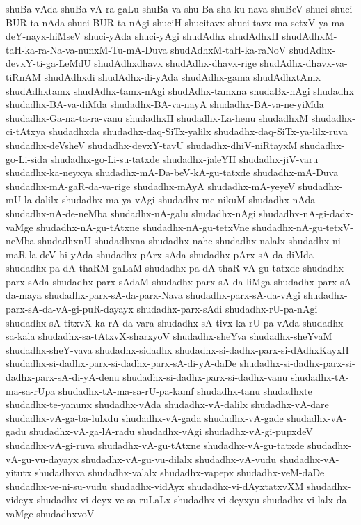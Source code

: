 {shuBa-vAda
shuBa-vA-ra-gaLu
shuBa-va-shu-Ba-sha-ku-nava
shuBeV
shuci
shuci-BUR-ta-nAda
shuci-BUR-ta-nAgi
shuciH
shucitavx
shuci-tavx-ma-setxV-ya-ma-deY-nayx-hiMseV
shuci-yAda
shuci-yAgi
shudAdhx
shudAdhxH
shudAdhxM-taH-ka-ra-Na-va-nunxM-Tu-mA-Duva
shudAdhxM-taH-ka-raNoV
shudAdhx-devxY-ti-ga-LeMdU
shudAdhxdhavx
shudAdhx-dhavx-rige
shudAdhx-dhavx-va-tiRnAM
shudAdhxdi
shudAdhx-di-yAda
shudAdhx-gama
shudAdhxtAmx
shudAdhxtamx
shudAdhx-tamx-nAgi
shudAdhx-tamxna
shudaBx-nAgi
shudadhx
shudadhx-BA-va-diMda
shudadhx-BA-va-nayA
shudadhx-BA-va-ne-yiMda
shudadhx-Ga-na-ta-ra-vanu
shudadhxH
shudadhx-La-henu
shudadhxM
shudadhx-ci-tAtxya
shudadhxda
shudadhx-daq-SiTx-yalilx
shudadhx-daq-SiTx-ya-lilx-ruva
shudadhx-deVsheV
shudadhx-devxY-tavU
shudadhx-dhiV-niRtayxM
shudadhx-go-Li-sida
shudadhx-go-Li-su-tatxde
shudadhx-jaleYH
shudadhx-jiV-varu
shudadhx-ka-neyxya
shudadhx-mA-Da-beV-kA-gu-tatxde
shudadhx-mA-Duva
shudadhx-mA-gaR-da-va-rige
shudadhx-mAyA
shudadhx-mA-yeyeV
shudadhx-mU-la-dalilx
shudadhx-ma-ya-vAgi
shudadhx-me-nikuM
shudadhx-nAda
shudadhx-nA-de-neMba
shudadhx-nA-galu
shudadhx-nAgi
shudadhx-nA-gi-dadx-vaMge
shudadhx-nA-gu-tAtxne
shudadhx-nA-gu-tetxVne
shudadhx-nA-gu-tetxV-neMba
shudadhxnU
shudadhxna
shudadhx-nahe
shudadhx-nalalx
shudadhx-ni-maR-la-deV-hi-yAda
shudadhx-pArx-sAda
shudadhx-pArx-sA-da-diMda
shudadhx-pa-dA-thaRM-gaLaM
shudadhx-pa-dA-thaR-vA-gu-tatxde
shudadhx-parx-sAda
shudadhx-parx-sAdaM
shudadhx-parx-sA-da-liMga
shudadhx-parx-sA-da-maya
shudadhx-parx-sA-da-parx-Nava
shudadhx-parx-sA-da-vAgi
shudadhx-parx-sA-da-vA-gi-puR-dayayx
shudadhx-parx-sAdi
shudadhx-rU-pa-nAgi
shudadhx-sA-titxvX-ka-rA-da-vara
shudadhx-sA-tivx-ka-rU-pa-vAda
shudadhx-sa-kala
shudadhx-sa-tAtxvX-sharxyoV
shudadhx-sheYva
shudadhx-sheYvaM
shudadhx-sheY-vava
shudadhx-sidadhx
shudadhx-si-dadhx-parx-si-dAdhxKayxH
shudadhx-si-dadhx-parx-si-dadhx-parx-sA-di-yA-daDe
shudadhx-si-dadhx-parx-si-dadhx-parx-sA-di-yA-denu
shudadhx-si-dadhx-parx-si-dadhx-vanu
shudadhx-tA-ma-sa-rUpa
shudadhx-tA-ma-sa-rU-pa-kamf
shudadhx-tanu
shudadhxte
shudadhx-te-yanunx
shudadhx-vAda
shudadhx-vA-dalilx
shudadhx-vA-dare
shudadhx-vA-ga-ba-lulxdu
shudadhx-vA-gada
shudadhx-vA-gade
shudadhx-vA-gadu
shudadhx-vA-ga-lA-radu
shudadhx-vAgi
shudadhx-vA-gi-pupxdeV
shudadhx-vA-gi-ruva
shudadhx-vA-gu-tAtxne
shudadhx-vA-gu-tatxde
shudadhx-vA-gu-vu-dayayx
shudadhx-vA-gu-vu-dilalx
shudadhx-vA-vudu
shudadhx-vA-yitutx
shudadhxva
shudadhx-valalx
shudadhx-vapepx
shudadhx-veM-daDe
shudadhx-ve-ni-su-vudu
shudadhx-vidAyx
shudadhx-vi-dAyxtatxvXM
shudadhx-videyx
shudadhx-vi-deyx-ve-sa-ruLaLx
shudadhx-vi-deyxyu
shudadhx-vi-lalx-da-vaMge
shudadhxvoV
}
